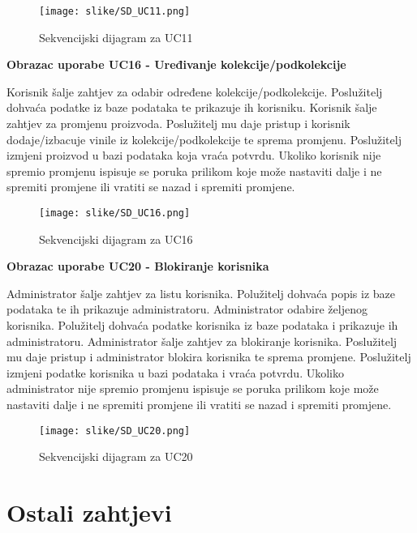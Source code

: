 				\begin{figure}[H]
					\texttt{[image: slike/SD\_UC11.png]}
					\centering
					\caption{Sekvencijski dijagram za UC11}
					\label{fig:UC11}
				\end{figure}
				
				\eject
				
			\textbf{Obrazac uporabe UC16 - Uređivanje kolekcije/podkolekcije}
				
				\text Korisnik šalje zahtjev za odabir određene kolekcije/podkolekcije. Poslužitelj dohvaća podatke iz baze podataka te prikazuje ih korisniku. Korisnik šalje zahtjev za promjenu proizvoda. Poslužitelj mu daje pristup i korisnik dodaje/izbacuje vinile iz kolekcije/podkolekcije te sprema promjenu. Poslužitelj izmjeni proizvod u bazi podataka koja vraća potvrdu.  Ukoliko korisnik nije spremio promjenu ispisuje se poruka prilikom koje može nastaviti dalje i ne spremiti promjene ili vratiti se nazad i spremiti promjene.
				
				\begin{figure}[H]
					\texttt{[image: slike/SD\_UC16.png]}
					\centering
					\caption{Sekvencijski dijagram za UC16}
					\label{fig:UC16}
				\end{figure}
				
				\eject
				
			\textbf{Obrazac uporabe UC20 - Blokiranje korisnika}
				
				\text 	Administrator šalje zahtjev za listu korisnika. Polužitelj dohvaća popis iz baze podataka te ih prikazuje administratoru. Administrator odabire željenog korisnika. Polužitelj dohvaća podatke korisnika iz baze podataka i prikazuje ih administratoru. Administrator šalje zahtjev za blokiranje korisnika. Poslužitelj mu daje pristup i administrator blokira korisnika te sprema promjene. Poslužitelj izmjeni podatke korisnika u bazi podataka i vraća potvrdu. Ukoliko administrator nije spremio promjenu ispisuje se poruka prilikom koje može nastaviti dalje i ne spremiti promjene ili vratiti se nazad i spremiti promjene.
				
				\begin{figure}[H]
					\texttt{[image: slike/SD\_UC20.png]}
					\centering
					\caption{Sekvencijski dijagram za UC20}
					\label{fig:UC20}
				\end{figure}
				
				\eject
	
		\section{Ostali zahtjevi}
		

